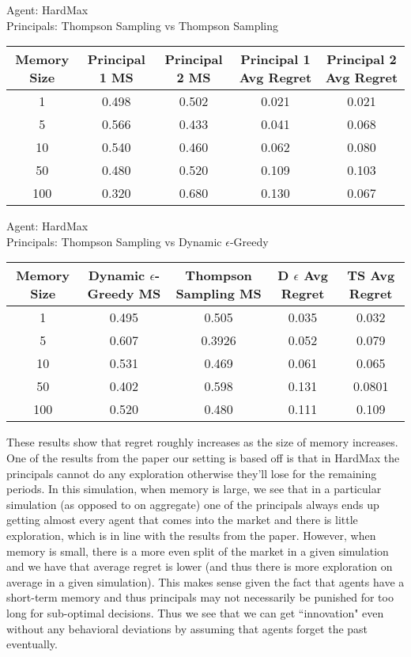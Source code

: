 \documentclass[11pt,letterpaper]{article}
\begin{document}
\begin{center}
Agent: HardMax \\Principals: Thompson Sampling vs Thompson Sampling
 \begin{tabular}{||c c c c c||} 
 \hline
 Memory Size & Principal 1 MS & Principal 2 MS & Principal 1 Avg Regret & Principal 2 Avg Regret  \\ [0.5ex] 
 \hline\hline
 1 & 0.498 & 0.502 & 0.021 & 0.021 \\ 
 \hline
 5 & 0.566 & 0.433 & 0.041 & 0.068 \\
 \hline
 10 & 0.540 & 0.460 & 0.062 & 0.080 \\
 \hline
 50 & 0.480 & 0.520 & 0.109 & 0.103 \\
 \hline
 100 & 0.320 & 0.680 & 0.130 & 0.067 \\ [1ex] 
 \hline
\end{tabular}

\vspace{0.75cm}
Agent: HardMax \\Principals: Thompson Sampling vs Dynamic $\epsilon$-Greedy
 \begin{tabular}{||c c c c c||} 
 \hline
 Memory Size & Dynamic $\epsilon$-Greedy MS  & Thompson Sampling MS & D $\epsilon$ Avg Regret & TS Avg Regret  \\ [0.5ex] 
 \hline\hline
 1 & 0.495 & 0.505 & 0.035 & 0.032 \\ 
 \hline
 5 & 0.607 & 0.3926 & 0.052 & 0.079 \\
 \hline
 10 & 0.531 & 0.469 & 0.061 & 0.065 \\
 \hline
 50 & 0.402 & 0.598 & 0.131 & 0.0801 \\
 \hline
 100 & 0.520 & 0.480 & 0.111 & 0.109 \\ [1ex] 
 \hline
\end{tabular}
\end{center}

These results show that regret roughly increases as the size of memory increases. One of the results from the paper our setting is based off is that in HardMax the principals cannot do any exploration otherwise they'll lose for the remaining periods. In this simulation, when memory is large, we see that in a particular simulation (as opposed to on aggregate) one of the principals always ends up getting almost every agent that comes into the market and there is little exploration, which is in line with the results from the paper. However, when memory is small, there is a more even split of the market in a given simulation and we have that average regret is lower (and thus there is more exploration on average in a given simulation). This makes sense given the fact that agents have a short-term memory and thus principals may not necessarily be punished for too long for sub-optimal decisions. Thus we see that we can get ``innovation" even without any behavioral deviations by assuming that agents forget the past eventually.
\end{document}
